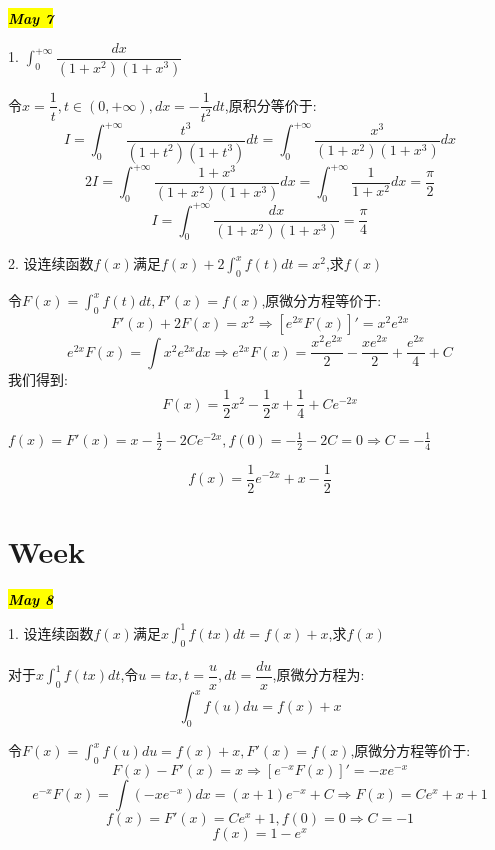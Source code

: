 \hl{\textbf{\textit{May 7}}}

1. $\int_{0}^{+\infty}\dfrac{dx}{(1+x^2)(1+x^3)}$
\begin{solution}
	
	令$x=\dfrac{1}{t},t\in(0,+\infty),dx=-\dfrac{1}{t^2}dt$,原积分等价于: 
	$$I=\int_{0}^{+\infty}\dfrac{t^3}{(1+t^2)(1+t^3)}dt=\int_{0}^{+\infty}\dfrac{x^3}{(1+x^2)(1+x^3)}dx$$
	$$2I=\int_{0}^{+\infty}\dfrac{1+x^3}{(1+x^2)(1+x^3)}dx=\int_{0}^{+\infty}\dfrac{1}{1+x^2}dx=\frac{\pi}{2}$$
	$$I=\int_{0}^{+\infty}\dfrac{dx}{(1+x^2)(1+x^3)}=\frac{\pi}{4}$$
\end{solution}

2. 设连续函数$f(x)$满足$f(x)+2\int_{0}^{x}f(t)dt=x^2$,求$f(x)$
\begin{solution}
	
	令$F(x)=\int_{0}^{x}f(t)dt,F'(x)=f(x)$,原微分方程等价于: 
	$$F'(x)+2F(x)=x^2\Rightarrow [e^{2x}F(x)]'=x^2e^{2x}$$
	$$e^{2x}F(x)=\int x^2e^{2x}dx\Rightarrow e^{2x}F(x)=\frac{x^2e^{2x}}{2}-\frac{xe^{2x}}{2}+\frac{e^{2x}}{4}+C$$
	我们得到: $$F(x)=\frac{1}{2}x^2-\frac{1}{2}x+\frac{1}{4}+Ce^{-2x}$$
	
	$f(x)=F'(x)=x-\frac{1}{2}-2Ce^{-2x},f(0)=-\frac{1}{2}-2C=0\Rightarrow C=-\frac{1}{4}$
	
	$$f(x)=\frac{1}{2}e^{-2x}+x-\frac{1}{2}$$
	
\end{solution}

\section{Week }
\hl{\textbf{\textit{May 8}}}

1. 设连续函数$f(x)$满足$x\int_{0}^{1}f(tx)dt=f(x)+x$,求$f(x)$
\begin{solution}
	
	对于$x\int_{0}^{1}f(tx)dt$,令$u=tx,t=\dfrac{u}{x},dt=\dfrac{du}{x}$,原微分方程为: 
	$$\int_{0}^{x}f(u)du=f(x)+x$$
	
	令$F(x)=\int_{0}^{x}f(u)du=f(x)+x,F'(x)=f(x)$,原微分方程等价于: 
	$$F(x)-F'(x)=x\Rightarrow [e^{-x}F(x)]'=-xe^{-x}$$
	$$e^{-x}F(x)=\int(-xe^{-x})dx=(x+1)e^{-x}+C\Rightarrow F(x)=Ce^{x}+x+1$$
	$$f(x)=F'(x)=Ce^{x}+1,f(0)=0\Rightarrow C=-1$$
	$$f(x)=1-e^{x}$$
\end{solution}

